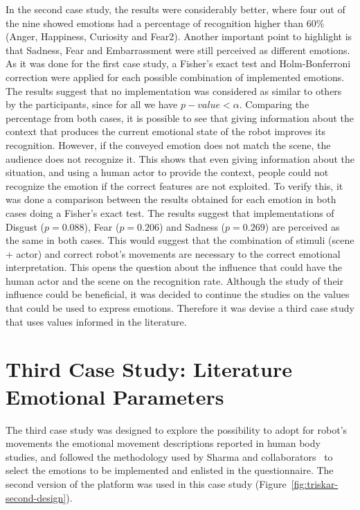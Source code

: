 In the second case study, the results were considerably better, where four out of the nine showed emotions had a percentage of recognition higher than 60\% (Anger, Happiness, Curiosity and Fear2). Another important point to highlight is that Sadness, Fear and Embarrassment were still perceived as different emotions. As it was done for the first case study, a Fisher's exact test and Holm-Bonferroni correction were applied for each possible combination of implemented emotions. The results suggest that no implementation was considered as similar to others by the participants, since for all we have $p-value<\alpha$.  Comparing the percentage from both cases, it is possible to see that giving information about the context that produces the current emotional state of the robot improves its recognition. However, if the conveyed emotion does not match the scene, the audience does not recognize it. This shows that even giving information about the situation, and using a human actor to provide the context, people could not recognize the emotion if the correct features are not exploited. To verify this, it was done a comparison between the results obtained for each emotion in both cases doing a Fisher's exact test. The results suggest that implementations of Disgust ($p=0.088$), Fear ($p=0.206$) and Sadness ($p=0.269$) are perceived as the same in both cases. This would suggest that the combination of stimuli (scene + actor) and correct robot's movements are necessary to the correct emotional interpretation. This opens the question about the influence that could have the human actor and the scene on the recognition rate. Although the study of their influence could be beneficial, it was decided to continue the studies on the values that could be used to express emotions. Therefore it was devise a third case study that uses values informed in the literature.

\section{Third Case Study: Literature Emotional Parameters}

The third case study was designed to explore the possibility to adopt for robot's movements the emotional movement descriptions reported in human body studies, and followed the methodology used by Sharma and collaborators~\cite{Sharma2013} to select the emotions to be implemented and enlisted in the questionnaire. The second version of the platform was used in this case study (Figure~\ref{fig:triskar-second-design}).

